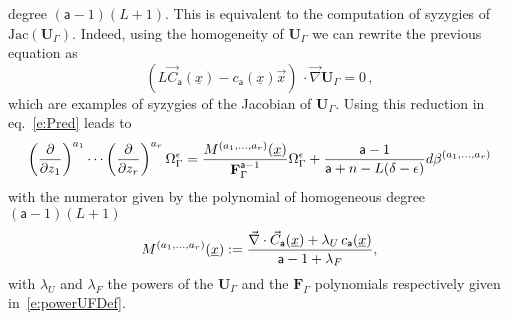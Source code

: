 \documentclass[a4paper,12pt]{article}
\numberwithin{equation}{section}
\numberwithin{figure}{section}
\begin{document}
degree $(\mathsf{a}-1)(L+1)$. This is equivalent to the computation of syzygies of $\text{Jac}( \mathbf U_\Gamma)$. Indeed,  using the homogeneity of $\mathbf{U}_\Gamma$ we can rewrite the previous equation as 
\begin{equation}
 \left( L   \vec
C_{\mathsf{a}}(\underline x) -
c_{\mathsf{a}}(\underline x) \vec{x} \right) \, \cdot\vec\nabla
\mathbf{U}_\Gamma =0\, ,
\end{equation}
which are examples of syzygies of the Jacobian of $\mathbf U_\Gamma$. Using this reduction in eq.~\eqref{e:Pred} leads to
% 
\begin{equation}\label{e:RedFinal}
\left(\partial\over \partial z_1\right)^{a_1}\cdots\left(\partial
  \over\partial z_r\right)^{a_r} \Omega_\Gamma^\epsilon={
M^{(a_1,\dots,a_r)}
     (\underline x)
\over \textbf{F}_\Gamma^{\mathsf{a}-1}}\Omega_\Gamma^\epsilon
+{  \mathsf{a}-1\over \mathsf{a}+n-L(\delta-\epsilon)} d\beta^{(a_1,\dots,a_r)}
\end{equation}
with the numerator given by the polynomial of homogeneous degree $(\mathsf{a}-1)(L+1)$
\begin{equation}
  \label{e:Mdimregfinal}
  M^{(a_1,\dots,a_r)}(\underline x):={\vec\nabla \cdot \vec C_{\mathsf{a}}
     (\underline x)
+ \lambda_U\, 
    c_{\mathsf{a}}(\underline x)\over \mathsf{a}-1+\lambda_F },
\end{equation}
with $\lambda_U$ and $\lambda_F$ the powers of the $\textbf{U}_\Gamma$
and the $\textbf{F}_\Gamma$ polynomials respectively given in~\eqref{e:powerUFDef}.
%
\end{document}
